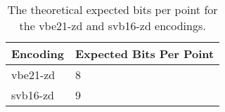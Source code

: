 \begin{table}
    \caption{\label{tab:vbe21-bpp} The theoretical expected bits per point for the
vbe21-zd and svb16-zd encodings.}
    \begin{tabular}{|l|l|}
        \hline
Encoding & Expected Bits Per Point\\
        \hline
vbe21-zd & 8\\
svb16-zd & 9\\
	\hline
    \end{tabular}
\end{table}
